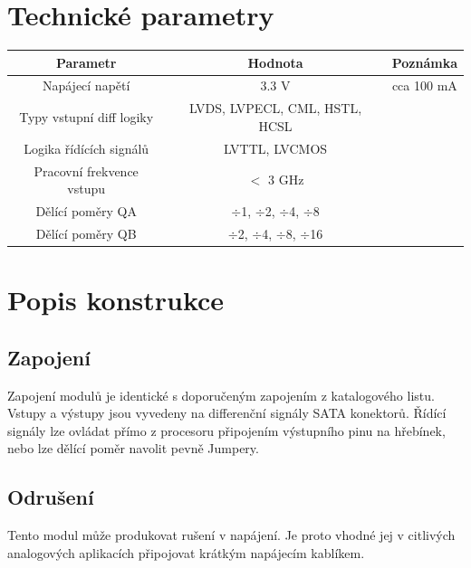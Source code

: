 \documentclass[12pt,a4paper,oneside]{article}
\begin{document}
\section{Technické parametry}
\begin{table}[htbp]
\begin{center}
\begin{tabular}{|c|c|c|}
\hline
\multicolumn{1}{|c|}{Parametr} & \multicolumn{1}{|c|}{Hodnota} & \multicolumn{1}{|c|}{Poznámka} \\ \hline
Napájecí napětí & 3.3 V &  cca 100 mA \\ \hline
Typy vstupní diff logiky  & LVDS, LVPECL, CML, HSTL, HCSL & \\ \hline
Logika řídících signálů  & LVTTL, LVCMOS & \\ \hline
Pracovní frekvence vstupu  & $<$ 3 GHz & \\ \hline
Dělící poměry QA & $\div$1, $\div$2, $\div$4, $\div$8 & \\ \hline
Dělící poměry QB & $\div$2, $\div$4, $\div$8, $\div$16 & \\ \hline
\end{tabular}
\end{center}
\end{table}

\newpage
\section{Popis konstrukce}

\subsection{Zapojení}

Zapojení modulů je identické s doporučeným zapojením z katalogového listu. Vstupy a výstupy jsou vyvedeny na differenční signály SATA konektorů. Řídící signály lze ovládat přímo z procesoru připojením výstupního pinu na hřebínek, nebo lze dělící poměr navolit pevně Jumpery. 



\subsection{Odrušení}

Tento modul může produkovat rušení v napájení. Je proto vhodné jej v citlivých analogových aplikacích připojovat krátkým napájecím kablíkem.
\end{document}
